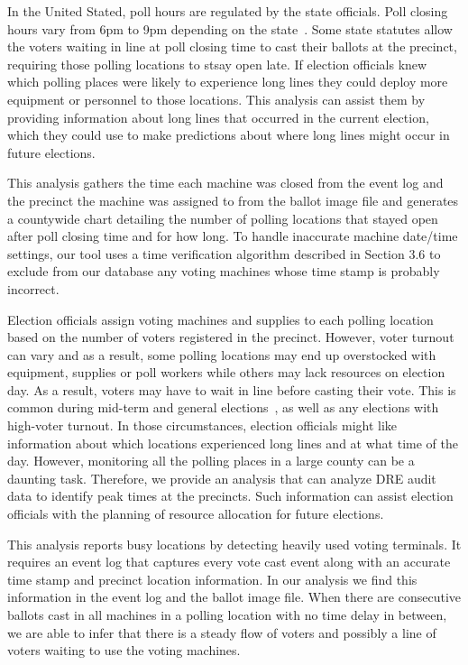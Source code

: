 In the United Stated, poll hours are regulated by the state
officials. Poll closing hours vary from 6pm to 9pm depending on the
state~\cite{Info2007}. Some state statutes allow the voters waiting in
line at poll closing time to cast their ballots at the precinct, requiring those
polling locations to stsay open late. If election officials knew which polling
places were likely to 
experience long lines they could deploy more equipment or personnel to
those locations. This analysis can assist them by providing
information about long lines that occurred in the current election, which they
could use to make predictions about where
long lines might occur in future elections.

This analysis gathers the time each machine was closed from the event log and
the precinct the machine was assigned to from the ballot image file
and generates a countywide chart detailing the number of polling
locations that stayed open after poll closing time and for how long. To handle
inaccurate machine date/time settings, our tool uses a time verification
algorithm described in Section 3.6 to exclude from our database any voting
machines whose time stamp is probably incorrect. 

Election officials assign voting machines and supplies to each polling
location based on the number of voters registered in the precinct.
However, voter turnout can vary and as a result, some polling
locations may end up overstocked with equipment, supplies or poll
workers while others may lack resources on election day. As a result,
voters may have to wait in line before casting their vote. This is
common during mid-term and general elections~\cite{Kreitman2010,
  Slade2008, U2010}, as well as any elections with high-voter turnout.
In those circumstances, election officials might like information
about which locations experienced long lines and at what time of the
day. However, monitoring all the polling places in a large county can
be a daunting task. Therefore, we provide an analysis that can analyze
DRE audit data to identify peak times at the precincts. Such
information can assist election officials with the planning of
resource allocation for future elections.

This analysis reports busy locations by detecting heavily used voting terminals. It requires an event log that captures every vote cast event along with an accurate time stamp and precinct location information. In our analysis we find this information in the event log and the ballot image file. When there are consecutive ballots cast in all machines in a polling location with no time delay in between, we are able to infer that there is a steady flow of voters and possibly a line of voters waiting to use the voting machines. 

